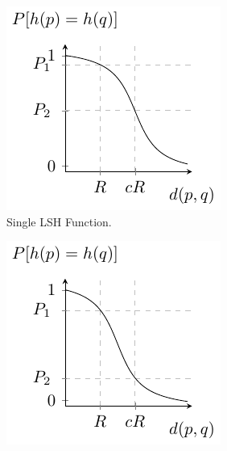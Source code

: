 \begin{figure}
    \centering
    \begin{subfigure}[b]{0.3\textwidth}
        \centering
        \includegraphics[width=\textwidth]{tikz/lsh_probability.pdf}
        \caption{Single LSH Function.}
        \label{subfig:lsh_probability}
    \end{subfigure}
    \hfill
    \begin{subfigure}[b]{0.3\textwidth}
        \centering
        \includegraphics[width=\textwidth]{tikz/lsh_probability_boosted.pdf}

\end{subfigure}
\end{figure}

